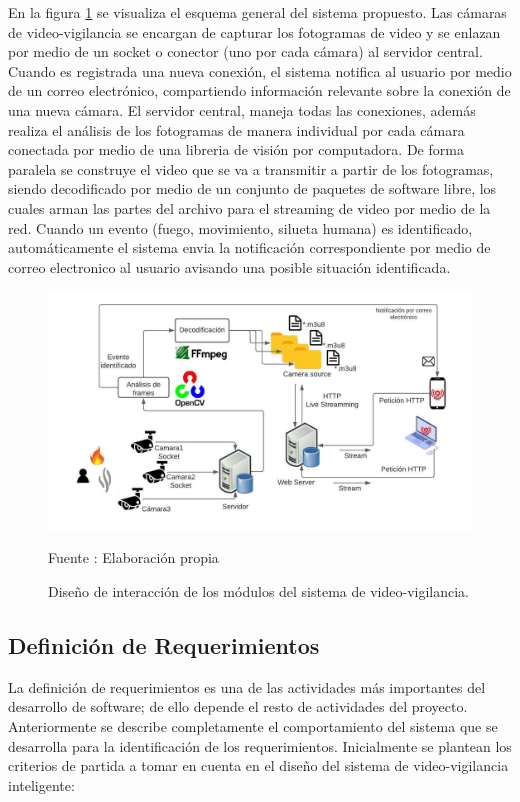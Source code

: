 En la figura \ref{fig:system_desing} se visualiza el esquema general del sistema propuesto. Las cámaras de video-vigilancia se encargan de capturar los fotogramas de video y se enlazan por medio de un socket o conector (uno por cada cámara) al servidor central. Cuando es registrada una nueva conexión, el sistema notifica al usuario por medio de un correo electrónico, compartiendo información relevante sobre la conexión de una nueva cámara. El servidor central, maneja todas las conexiones, además realiza el análisis de los fotogramas de manera individual por cada cámara conectada por medio de una libreria de visión por computadora. De forma paralela se construye el video que se va a transmitir a partir de los fotogramas, siendo decodificado por medio de un conjunto de paquetes de software libre, los cuales arman las partes del archivo para el streaming de video por medio de la red. Cuando un evento (fuego, movimiento, silueta humana) es identificado, automáticamente el sistema envia la notificación correspondiente por medio de correo electronico al usuario avisando una posible situación identificada.\\

\begin{figure}[H]
    \begin{center}
        \includegraphics[width=17cm]{img/capitulo_4/main.jpeg}
        \caption{Diseño de interacción de los módulos del sistema de video-vigilancia.}
        Fuente : Elaboración propia
        \label{fig:system_desing}
    \end{center}
\end{figure}

\subsection{Definición de Requerimientos}
La definición de requerimientos es una de las actividades más importantes del desarrollo de software; de ello depende el resto de actividades del proyecto. Anteriormente se describe completamente el comportamiento del sistema que se desarrolla para la identificación de los requerimientos. Inicialmente se plantean los criterios de partida a tomar en cuenta en el diseño del sistema de video-vigilancia inteligente:


